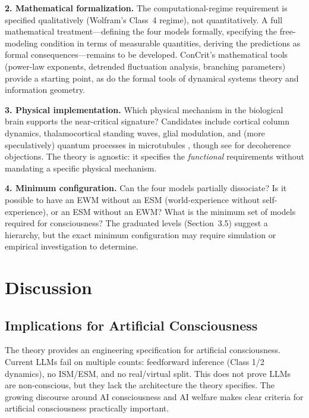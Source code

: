 \documentclass[12pt]{article}
\begin{document}
\textbf{2. Mathematical formalization.} The computational-regime requirement is specified qualitatively (Wolfram's Class~4 regime), not quantitatively. A full mathematical treatment---\hspace{0pt}defining the four models formally, specifying the free-modeling condition in terms of measurable quantities, deriving the predictions as formal consequences---\hspace{0pt}remains to be developed. ConCrit's mathematical tools (power-law exponents, detrended fluctuation analysis, branching parameters) provide a starting point, as do the formal tools of dynamical systems theory and information geometry.

\textbf{3. Physical implementation.} Which physical mechanism in the biological brain supports the near-critical signature? Candidates include cortical column dynamics, thalamocortical standing waves, glial modulation, and (more speculatively) quantum processes in microtubules \citep{HameroffPenrose1996}, though see \citet{Tegmark2000} for decoherence objections. The theory is agnostic: it specifies the \emph{functional} requirements without mandating a specific physical mechanism.

\textbf{4. Minimum configuration.} Can the four models partially dissociate? Is it possible to have an EWM without an ESM (world-experience without self-experience), or an ESM without an EWM? What is the minimum set of models required for consciousness? The graduated levels (Section~3.5) suggest a hierarchy, but the exact minimum configuration may require simulation or empirical investigation to determine.



\section{Discussion}


\subsection{Implications for Artificial Consciousness}

The theory provides an engineering specification for artificial consciousness. Current LLMs fail on multiple counts: feedforward inference (Class 1/2 dynamics), no ISM/ESM, and no real/virtual split. This does not prove LLMs are non-conscious, but they lack the architecture the theory specifies. The growing discourse around AI consciousness \citep{Butlin2023,Schwitzgebel2025,Birch2025} and AI welfare \citep{Long2024,Anthropic2025} makes clear criteria for artificial consciousness practically important.
\end{document}
